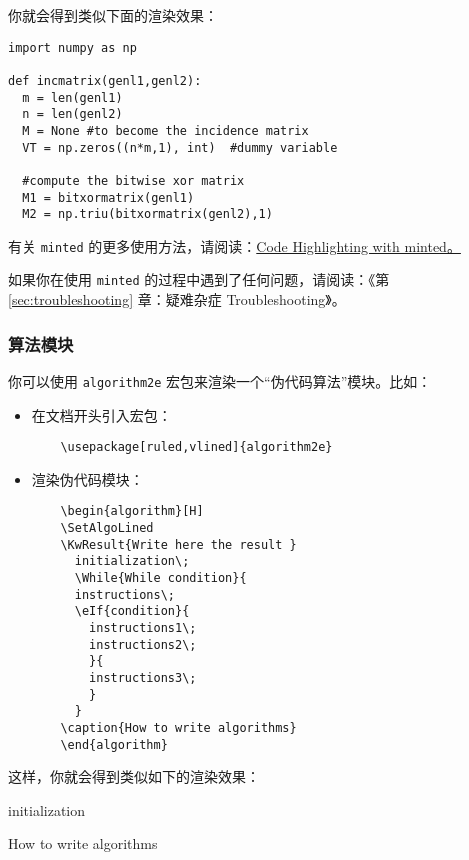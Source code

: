 你就会得到类似下面的渲染效果：

\begin{verbatim}
import numpy as np

def incmatrix(genl1,genl2):
  m = len(genl1)
  n = len(genl2)
  M = None #to become the incidence matrix
  VT = np.zeros((n*m,1), int)  #dummy variable

  #compute the bitwise xor matrix
  M1 = bitxormatrix(genl1)
  M2 = np.triu(bitxormatrix(genl2),1)
\end{verbatim}

有关 \texttt{minted} 的更多使用方法，请阅读：\href{https://www.overleaf.com/learn/latex/Code_Highlighting_with_minted}{Code Highlighting with minted。}

如果你在使用 \texttt{minted} 的过程中遇到了任何问题，请阅读：《第 \ref{sec:troubleshooting} 章：疑难杂症 Troubleshooting》。

\subsubsection{算法模块}

你可以使用 \texttt{algorithm2e} 宏包来渲染一个“伪代码算法”模块。比如：

\begin{itemize}
  \item 在文档开头引入宏包：
        \begin{verbatim}
    \usepackage[ruled,vlined]{algorithm2e}
  \end{verbatim}
  \item 渲染伪代码模块：
        \begin{verbatim}
    \begin{algorithm}[H]
    \SetAlgoLined
    \KwResult{Write here the result }
      initialization\;
      \While{While condition}{
      instructions\;
      \eIf{condition}{
        instructions1\;
        instructions2\;
        }{
        instructions3\;
        }
      }
    \caption{How to write algorithms}
    \end{algorithm}
  \end{verbatim}
\end{itemize}

这样，你就会得到类似如下的渲染效果：

\begin{algorithm}[H]
  \SetAlgoLined
  initialization\;
  \caption{How to write algorithms}
\end{algorithm}

